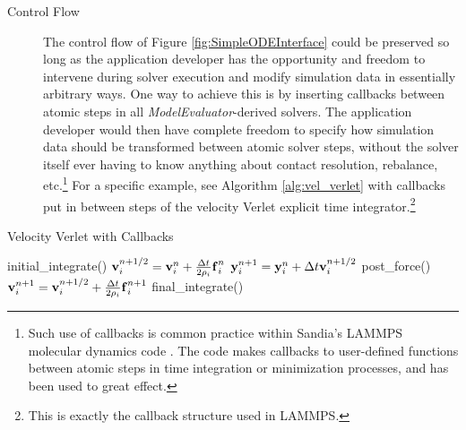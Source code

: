 \documentclass[10pt]{article}
\theoremstyle{plain}
\theoremstyle{definition}
\theoremstyle{remark}
\numberwithin{equation}{section}
\newcommand{\bdf}{\ensuremath{\mbox{\textbf{f}}}}
\newcommand{\bdy}{\ensuremath{\mbox{\textbf{y}}}}
\newcommand{\bdv}{\ensuremath{\mbox{\textbf{v}}}}
\begin{document}
\begin{description}
  \item[Control Flow] The control flow of Figure \ref{fig:SimpleODEInterface} could be preserved so long as the application developer has the opportunity and freedom to intervene during solver execution and modify simulation data in essentially arbitrary ways. One way to achieve this is by inserting callbacks between atomic steps in all \emph{ModelEvaluator}-derived solvers. The application developer would then have complete freedom to specify how simulation data should be transformed between atomic solver steps, without the solver itself ever having to know anything about contact resolution, rebalance, etc.\footnote{Such use of callbacks is common practice within Sandia's LAMMPS molecular dynamics code \cite{Plimpton:LAMMPS:1995}. The code makes callbacks to user-defined functions between atomic steps in time integration or minimization processes, and has been used to great effect.} For a specific example, see Algorithm \ref{alg:vel_verlet} with callbacks put in between steps of the velocity Verlet explicit time integrator.\footnote{This is exactly the callback structure used in LAMMPS.}
\end{description}

\begin{algorithm}
\caption{Velocity Verlet with Callbacks} \label{alg:vel_verlet}
\begin{algorithmic}[1]
   \STATE initial\_integrate()
   \STATE $\bdv_i^{n + 1/2} = \bdv_i^n + \frac{\Delta t}{2 \rho_i} \bdf_i^n$
   \STATE $\bdy_i^{n+1}     = \bdy_i^n + \Delta t \bdv_i^{n + 1/2}$
   \STATE post\_force()
   \STATE $\bdv_i^{n+1} = \bdv_i^{n+1/2} + \frac{\Delta t}{2 \rho_i} \bdf_i^{n+1}$
   \STATE final\_integrate()
\end{algorithmic}
\end{algorithm}




\end{document}
